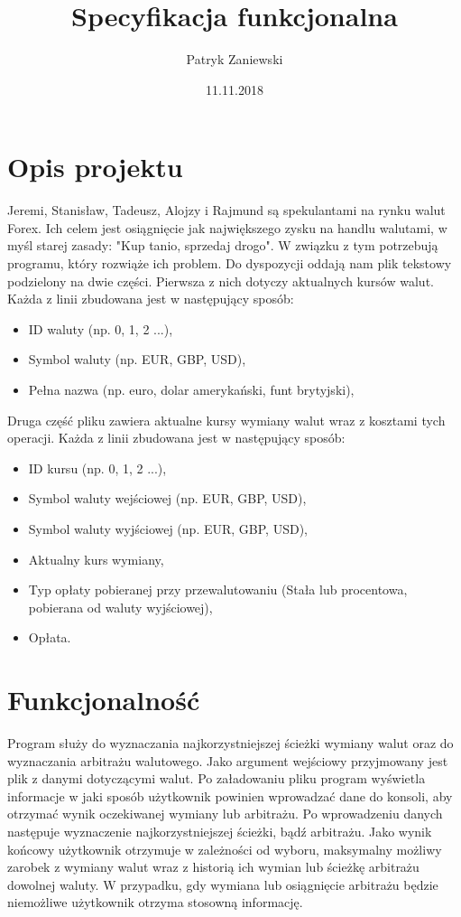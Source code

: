﻿\documentclass{article}
\title{Specyfikacja funkcjonalna}
\author{Patryk Zaniewski}
\date{11.11.2018}
\begin{document}
\maketitle
\tableofcontents
\newpage

\section{Opis projektu}
Jeremi, Stanisław, Tadeusz, Alojzy i Rajmund są spekulantami na rynku walut Forex. Ich celem jest osiągnięcie jak największego zysku na handlu walutami, w myśl starej zasady: "Kup tanio, sprzedaj drogo". W związku z tym potrzebują programu, który rozwiąże ich problem. Do dyspozycji oddają nam plik tekstowy podzielony na dwie części.
\newline\newline
Pierwsza z nich dotyczy aktualnych kursów walut. Każda z linii zbudowana jest w następujący sposób:
\begin{itemize}
    \item ID waluty (np. 0, 1, 2 ...),
    \item Symbol waluty (np. EUR, GBP, USD),
    \item Pełna nazwa (np. euro, dolar amerykański, funt brytyjski),
\end{itemize}
Druga część pliku zawiera aktualne kursy wymiany walut wraz z kosztami tych operacji. Każda z linii zbudowana jest w następujący sposób:
\begin{itemize}
    \item ID kursu (np. 0, 1, 2 ...),
    \item Symbol waluty wejściowej (np. EUR, GBP, USD),
    \item Symbol waluty wyjściowej (np. EUR, GBP, USD),
    \item Aktualny kurs wymiany,
    \item Typ opłaty pobieranej przy przewalutowaniu (Stała lub procentowa, pobierana od waluty wyjściowej),
    \item Opłata.
\end{itemize}

\section{Funkcjonalność}
Program służy do wyznaczania najkorzystniejszej ścieżki wymiany walut oraz do wyznaczania arbitrażu walutowego. 
\newline\newline Jako argument wejściowy przyjmowany jest plik z danymi dotyczącymi walut. Po załadowaniu pliku program wyświetla informacje w jaki sposób użytkownik powinien wprowadzać dane do konsoli, aby otrzymać wynik oczekiwanej wymiany lub arbitrażu. Po wprowadzeniu danych następuje wyznaczenie najkorzystniejszej ścieżki, bądź arbitrażu.
\newline\newline Jako wynik końcowy użytkownik otrzymuje w zależności od wyboru, maksymalny możliwy zarobek z wymiany walut wraz z historią ich wymian lub ścieżkę arbitrażu dowolnej waluty. W przypadku, gdy wymiana lub osiągnięcie arbitrażu będzie niemożliwe użytkownik otrzyma stosowną informację.
\end{document}
